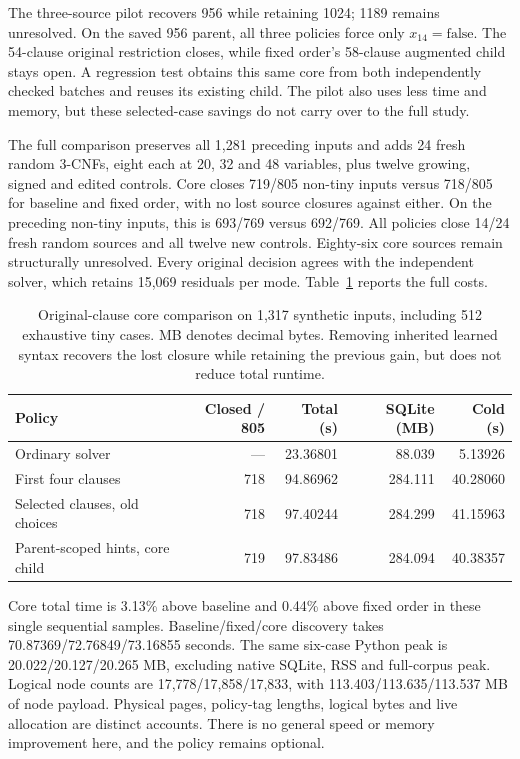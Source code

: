 \documentclass[11pt,a4paper]{article}
\numberwithin{equation}{section}
\theoremstyle{plain}
\theoremstyle{definition}
\theoremstyle{remark}
\begin{document}
The three-source pilot recovers 956 while retaining 1024; 1189 remains unresolved. On the saved 956 parent, all three policies force only $x_{14}=\mathrm{false}$. The 54-clause original restriction closes, while fixed order's 58-clause augmented child stays open. A regression test obtains this same core from both independently checked batches and reuses its existing child. The pilot also uses less time and memory, but these selected-case savings do not carry over to the full study.

The full comparison preserves all 1,281 preceding inputs and adds 24 fresh random 3-CNFs, eight each at 20, 32 and 48 variables, plus twelve growing, signed and edited controls. Core closes 719/805 non-tiny inputs versus 718/805 for baseline and fixed order, with no lost source closures against either. On the preceding non-tiny inputs, this is 693/769 versus 692/769. All policies close 14/24 fresh random sources and all twelve new controls. Eighty-six core sources remain structurally unresolved. Every original decision agrees with the independent solver, which retains 15,069 residuals per mode. Table~\ref{tab:learning-core} reports the full costs.

\begin{table}[htbp]
\centering
\small
\begin{tabular}{lrrrr}
\hline
Policy & Closed / 805 & Total (s) & SQLite (MB) & Cold (s) \\
\hline
Ordinary solver & --- & 23.36801 & 88.039 & 5.13926 \\
First four clauses & 718 & 94.86962 & 284.111 & 40.28060 \\
Selected clauses, old choices & 718 & 97.40244 & 284.299 & 41.15963 \\
Parent-scoped hints, core child & 719 & 97.83486 & 284.094 & 40.38357 \\
\hline
\end{tabular}
\caption{Original-clause core comparison on 1,317 synthetic inputs, including 512 exhaustive tiny cases. MB denotes decimal bytes. Removing inherited learned syntax recovers the lost closure while retaining the previous gain, but does not reduce total runtime.}
\label{tab:learning-core}
\end{table}

Core total time is 3.13\% above baseline and 0.44\% above fixed order in these single sequential samples. Baseline/fixed/core discovery takes 70.87369/72.76849/73.16855 seconds. The same six-case Python peak is 20.022/20.127/20.265 MB, excluding native SQLite, RSS and full-corpus peak. Logical node counts are 17,778/17,858/17,833, with 113.403/113.635/113.537 MB of node payload. Physical pages, policy-tag lengths, logical bytes and live allocation are distinct accounts. There is no general speed or memory improvement here, and the policy remains optional.
\end{document}
